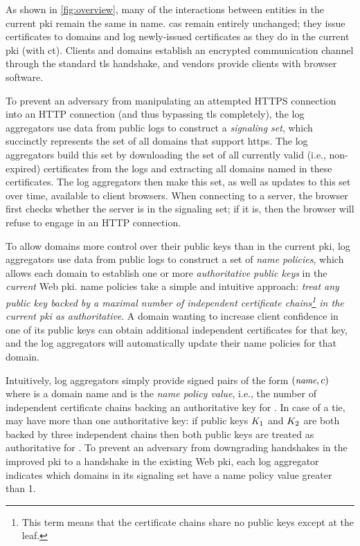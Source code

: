 As shown in \autoref{fig:overview}, many of the interactions between entities in
the current \ac{pki} remain the same in \ac{name}. \acp{ca} remain entirely unchanged;
they issue certificates
to domains and log newly-issued certificates as they do in the current \ac{pki}
(with \ac{ct}). Clients and domains establish an encrypted communication channel
through the standard \ac{tls} handshake, and vendors provide clients with browser
software.

To prevent an adversary from manipulating an attempted HTTPS connection into
an HTTP connection (and thus bypassing \ac{tls}
completely), the log aggregators use data from public logs to construct a
\emph{signaling set}, which succinctly represents the set of all domains that
support \ac{https}. The log aggregators build this set by downloading the set of
all currently valid (i.e., non-expired) certificates from the logs and
extracting all domains named in these certificates. The log aggregators then
make this set, as well as updates to this set over time, available to client
browsers.  When connecting to a server, the browser first checks whether
the server is in the signaling set; if it is, then the browser will refuse
to engage in an HTTP connection.

To allow domains more control over their public keys than in the current
\ac{pki}, log aggregators use data from public logs to construct a set of
\emph{\ac{name} policies}, which allows each domain to establish one or more
\emph{authoritative public keys} in the \emph{current} Web \ac{pki}. \ac{name}
policies take a simple and intuitive approach: \emph{treat any public key backed
  by a maximal number of independent certificate chains\footnote{This term means
  that the certificate chains share no public keys except at the leaf.} in the
current \ac{pki} as authoritative}. A domain wanting to increase client
confidence in one of its public keys can obtain additional independent
certificates for that key, and the log aggregators will automatically update
their \ac{name} policies for that domain.

Intuitively, log aggregators simply provide signed pairs of the form
$(\small{\emph{name}}, c)$ where \hostname is a domain name and \policy is the
\emph{\ac{name} policy value}, i.e., the number of independent certificate
chains backing an authoritative key for \hostname. In case of a tie, \hostname
may have more than one authoritative key: if public keys $K_1$ and $K_2$ are
both backed by three independent chains then both public keys are treated as
authoritative for \hostname. To prevent an adversary from downgrading handshakes
in the improved \ac{pki} to a handshake in the existing Web \ac{pki}, each log
aggregator indicates which domains in its signaling set have a \ac{name} policy
value greater than 1.

